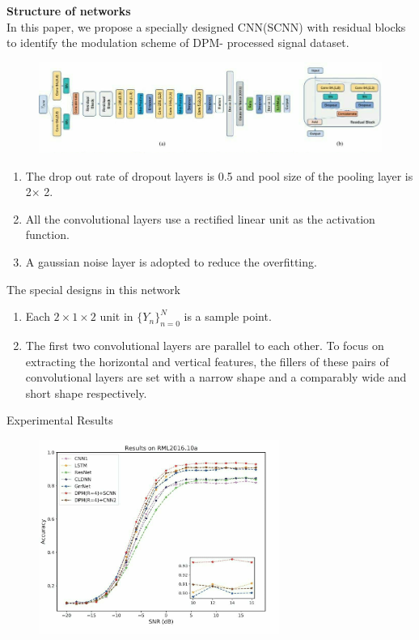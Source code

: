 \documentclass{beamer}
\begin{document}
\begin{frame}
\textbf{Structure of networks}\\
In this paper, we propose a specially designed CNN(SCNN) with residual blocks to identify the modulation scheme of DPM- processed signal dataset.
  \begin{figure}[h]
    \centering
    \includegraphics[width=\textwidth]{fig 2.jpeg}
\end{figure}  
\end{frame}
\begin{frame}
\begin{enumerate}[]
    \item The drop out rate of dropout layers is 0.5 and pool size of the pooling layer is 2$\times$ 2.
    \item All the convolutional layers use a rectified linear unit as the activation function.
    \item A gaussian noise layer is adopted to reduce the overfitting.
\end{enumerate}
 \begin{block}{The special designs in this network}
 \begin{enumerate}[]
     \item Each $2\times 1 \times 2$ unit in $\{Y_{n}\}_{n=0}^{N}$ is a sample point.
     \item The first two convolutional layers are parallel to each other. To focus on extracting the horizontal and vertical features, the fillers of these pairs of convolutional layers are set with a narrow shape and a comparably wide and short shape respectively. 
 \end{enumerate}
 \end{block}
\end{frame}
\begin{frame}{Experimental Results}
 \begin{figure}[h]
    \centering
    \includegraphics[width=0.7\textwidth]{fig 4.jpeg}
\end{figure} 
\end{frame}
\end{document}
